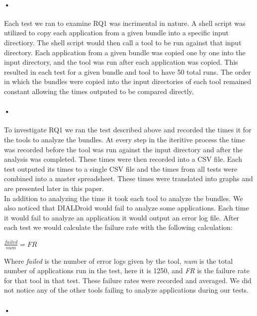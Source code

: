 \documentclass[twocolumn]{article}
\begin{document}
\paragraph{•}
	Each test we ran to examine RQ1 was incrimental in nature. A shell script was utilized to copy each application from a given bundle into a specific input directiory. The shell script would then call a tool to be run against that input directory. Each application from a given bundle was copied one by one into the input directory, and the tool was run after each application was copied. This resulted in each test for a given bundle and tool to have 50 total runs. The order in which the bundles were copied into the input directories of each tool remained constant allowing the times outputed to be compared directly. 
\paragraph{•}
	To investigate RQ1 we ran the test described above and recorded the times it for the tools to analyze the bundles. At every step in the iteritive process the time was recorded before the tool was run against the input directory and after the analysis was completed. These times were then recorded into a CSV file. Each test outputed its times to a single CSV file and the times from all tests were combined into a master spreadsheet. These times were translated into graphs and are presented later in this paper.\\

	In addition to analyzing the time it took each tool to analyze the bundles. We also noticed that DIALDroid would fail to analyze some applications. Each time it would fail to analyze an application it would output an error log file. After each test we would calculate the failure rate with the following calculation:\\
	\begin{center}
		\(\frac{failed}{num}=FR\)
	\end{center}
	Where \textit{failed} is the number of error logs given by the tool, \textit{num} is the total number of applications run in the test, here it is 1250, and \textit{FR} is the failure rate for that tool in that test. These failure rates were recorded and averaged. We did not notice any of the other tools failing to analyze applications during our tests.
\paragraph{•}
	
\end{document}
